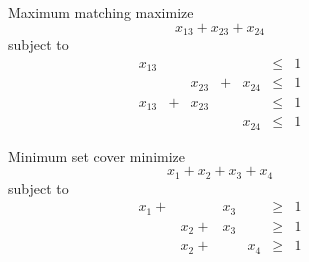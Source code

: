 \documentclass[hyperref={pdfpagelabels=false}]{beamer}
\begin{document}
{	\begin{center}
	\begin{figure}[h]
		\hfill
		\centering
		\begin{minipage}[c]{.45\textwidth}
		\centering
		\begin{block}{Maximum matching}
		maximize
		\begin{equation*}
		x_{13} + x_{23} + x_{24}
		\end{equation*}
		subject to
		\begin{equation*}
		\begin{array}{ccccccc}
	  	x_{13} &   &        &   &        & \leq & 1\\
		       &   & x_{23} & + & x_{24} & \leq & 1\\
		x_{13} & + & x_{23} &   &        & \leq & 1\\
		       &   &        &   & x_{24} & \leq & 1
	  	\end{array}
	  	\end{equation*}
		\end{block}
		\end{minipage}
		\hfill
		\centering
		\begin{minipage}[c]{.45\textwidth}
		\centering
		\begin{block}{Minimum set cover}
		minimize
		\begin{equation*}
		x_{1} + x_{2} + x_{3} + x_{4}
		\end{equation*}
		subject to
		\begin{equation*}
		\begin{array}{cccccccc}
	  	x_{1}+ &        & x_{3} &       & \geq & 1\\
		       & x_{2}+ & x_{3} &       & \geq & 1\\
		       & x_{2}+ &       & x_{4} & \geq & 1\\
		       &        &       &       &      &  \\
	  	\end{array}
	  	\end{equation*}
		\end{block}
		\end{minipage}
		\hfill
	\end{figure}
	\end{center}
}
\end{document}
